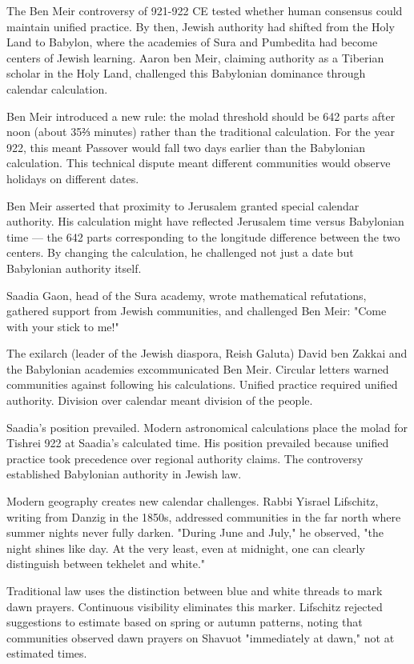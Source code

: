 The Ben Meir controversy of 921-922 CE tested whether human consensus could maintain unified practice. By then, Jewish authority had shifted from the Holy Land to Babylon, where the academies of Sura and Pumbedita had become centers of Jewish learning. Aaron ben Meir, claiming authority as a Tiberian scholar in the Holy Land, challenged this Babylonian dominance through calendar calculation.

Ben Meir introduced a new rule: the molad threshold should be 642 parts after noon (about 35⅔ minutes) rather than the traditional calculation. For the year 922, this meant Passover would fall two days earlier than the Babylonian calculation. This technical dispute meant different communities would observe holidays on different dates.

 Ben Meir asserted that proximity to Jerusalem granted special calendar authority. His calculation might have reflected Jerusalem time versus Babylonian time — the 642 parts corresponding to the longitude difference between the two centers. By changing the calculation, he challenged not just a date but Babylonian authority itself.

Saadia Gaon, head of the Sura academy, wrote mathematical refutations, gathered support from Jewish communities, and challenged Ben Meir: "Come with your stick to me!"

The exilarch (leader of the Jewish diaspora, Reish Galuta) David ben Zakkai and the Babylonian academies excommunicated Ben Meir. Circular letters warned communities against following his calculations. Unified practice required unified authority. Division over calendar meant division of the people.

Saadia's position prevailed. Modern astronomical calculations place the molad for Tishrei 922 at Saadia's calculated time. His position prevailed because unified practice took precedence over regional authority claims. The controversy established Babylonian authority in Jewish law.

Modern geography creates new calendar challenges. Rabbi Yisrael Lifschitz, writing from Danzig in the 1850s, addressed communities in the far north where summer nights never fully darken. "During June and July," he observed, "the night shines like day. At the very least, even at midnight, one can clearly distinguish between tekhelet and white." 

Traditional law uses the distinction between blue and white threads to mark dawn prayers. Continuous visibility eliminates this marker. Lifschitz rejected suggestions to estimate based on spring or autumn patterns, noting that communities observed dawn prayers on Shavuot "immediately at dawn," not at estimated times.

